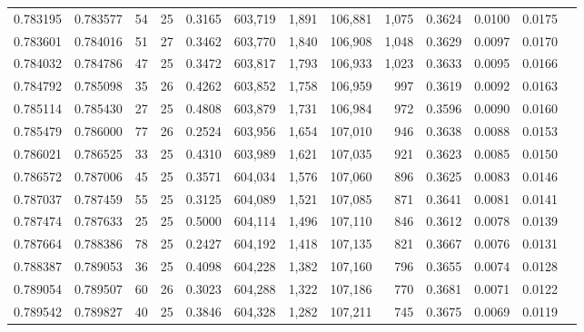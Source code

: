 \begin{tabular}{rrrrrrrrrrrrr}
0.783195 & 0.783577 &  54 &  25 &                                     0.3165 & 603,719 &   1,891 & 106,881 &   1,075 & 0.3624 & 0.0100 & 0.0175 \\
0.783601 & 0.784016 &  51 &  27 &                                     0.3462 & 603,770 &   1,840 & 106,908 &   1,048 & 0.3629 & 0.0097 & 0.0170 \\
0.784032 & 0.784786 &  47 &  25 &                                     0.3472 & 603,817 &   1,793 & 106,933 &   1,023 & 0.3633 & 0.0095 & 0.0166 \\
0.784792 & 0.785098 &  35 &  26 &                                     0.4262 & 603,852 &   1,758 & 106,959 &     997 & 0.3619 & 0.0092 & 0.0163 \\
0.785114 & 0.785430 &  27 &  25 &                                     0.4808 & 603,879 &   1,731 & 106,984 &     972 & 0.3596 & 0.0090 & 0.0160 \\
0.785479 & 0.786000 &  77 &  26 &                                     0.2524 & 603,956 &   1,654 & 107,010 &     946 & 0.3638 & 0.0088 & 0.0153 \\
0.786021 & 0.786525 &  33 &  25 &                                     0.4310 & 603,989 &   1,621 & 107,035 &     921 & 0.3623 & 0.0085 & 0.0150 \\
0.786572 & 0.787006 &  45 &  25 &                                     0.3571 & 604,034 &   1,576 & 107,060 &     896 & 0.3625 & 0.0083 & 0.0146 \\
0.787037 & 0.787459 &  55 &  25 &                                     0.3125 & 604,089 &   1,521 & 107,085 &     871 & 0.3641 & 0.0081 & 0.0141 \\
0.787474 & 0.787633 &  25 &  25 &                                     0.5000 & 604,114 &   1,496 & 107,110 &     846 & 0.3612 & 0.0078 & 0.0139 \\
0.787664 & 0.788386 &  78 &  25 &                                     0.2427 & 604,192 &   1,418 & 107,135 &     821 & 0.3667 & 0.0076 & 0.0131 \\
0.788387 & 0.789053 &  36 &  25 &                                     0.4098 & 604,228 &   1,382 & 107,160 &     796 & 0.3655 & 0.0074 & 0.0128 \\
0.789054 & 0.789507 &  60 &  26 &                                     0.3023 & 604,288 &   1,322 & 107,186 &     770 & 0.3681 & 0.0071 & 0.0122 \\
0.789542 & 0.789827 &  40 &  25 &                                     0.3846 & 604,328 &   1,282 & 107,211 &     745 & 0.3675 & 0.0069 & 0.0119 \\

\end{tabular}
